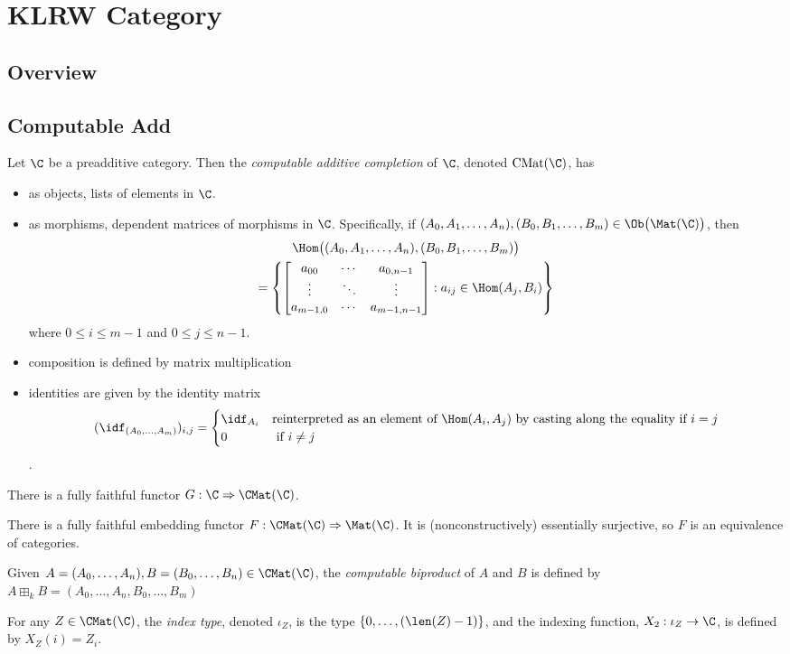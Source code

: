 \chapter{KLRW Category}

\section{Overview}
\section{Computable Add}


\begin{definition}
 Let $\C$ be a preadditive category. Then the \emph{computable additive completion}
 of $\C$, denoted $\operatorname{CMat}(\C)$, has
 \begin{itemize}
  \item as objects, lists of elements in $\C$.
  \item as morphisms, dependent matrices of morphisms in $\C$.
  Specifically, if $(A_0, A_1, \ldots, A_n), (B_0, B_1, \ldots, B_m) \in \Ob\big(\Mat(\C)\big)$, then
\begin{multline*}
\Hom\big((A_0, A_1, \ldots, A_n), (B_0, B_1, \ldots, B_m)\big) \\
= \left\{
\begin{bmatrix}
  a_{00} & \cdots & a_{0,n-1} \\
  \vdots & \ddots & \vdots \\
  a_{m-1,0} & \cdots & a_{m-1,n-1}
\end{bmatrix}
: a_{ij} \in \Hom(A_j, B_i)
\right\}
\end{multline*}
where $0 \le i \le m-1$ and $0 \le j \le n-1$.

  \item composition is defined by matrix multiplication
  \item identities are given by the identity matrix
  $$ (\idf_{(A_0, \ldots, A_m)})_{i, j} = \begin{cases}
  \idf_{A_i} & \text{reinterpreted as an element of }\Hom(A_i, A_j)
  \text{ by casting along the equality if }i = j
  \\ 0 & \text{ if }i\ne j
  \end{cases}$$.
 \end{itemize}
\end{definition}
  There is a fully faithful functor $G: \C \Rightarrow \CMat(\C)$.

  There is a fully faithful embedding functor $F: \CMat(\C) \Rightarrow \Mat (\C)$.
  It is (nonconstructively) essentially surjective, so $F$ is an equivalence
  of categories.
\begin{definition}
  Given $A = (A_0, \ldots, A_n), B=(B_0, \ldots, B_n)\in \CMat(\C)$, the
  \emph{computable biproduct} of $A$ and $B$ is defined by $A\boxplus_k B = (A_0, \ldots, A_n, B_0, \ldots, B_m)$
\end{definition}
\begin{definition}
  For any $Z\in \CMat (\C)$, the \emph{index type}, denoted $\iota_Z$, is the type
  $\{ 0, \ldots, (\len(Z)-1)\}$, and the indexing function, $X_2: \iota_Z\to \C$,
  is defined by $X_Z(i) = Z_i$.
\end{definition}

